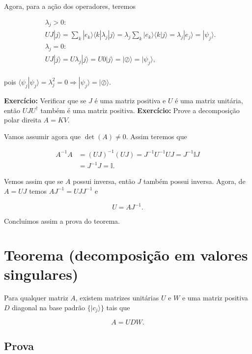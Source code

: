 \documentclass[11pt]{article}
\begin{document}
Agora, para a ação dos operadores, teremos

\begin{align}
& \lambda_{j}>0: \\
& UJ|j\rangle = \sum_{k}|e_{k}\rangle\langle k|\lambda_{j}|j\rangle = \lambda_{j}\sum_{k}|e_{k}\rangle\langle k|j\rangle = \lambda_{j}|e_{j}\rangle = |\psi_{j}\rangle. \\
& \lambda_{j}=0: \\
& UJ|j\rangle = U\lambda_{j}|j\rangle = U0|j\rangle  = |\oslash\rangle = |\psi_{j}\rangle, \\
\end{align}

pois
\(\langle\psi_{j}|\psi_{j}\rangle=\lambda_{j}^{2}=0\Rightarrow|\psi_{j}\rangle=|\oslash\rangle\).

\textbf{Exercício:} Verificar que se \(J\) é uma matriz positiva e \(U\)
é uma matriz unitária, então \(UJU^{\dagger}\) também é uma matriz
positiva. \textbf{Exercício:} Prove a decomposição polar direita
\(A=KV\).

Vamos assumir agora que \(\det(A)\ne 0\). Assim teremos que

\begin{align}
A^{-1}A & = (UJ)^{-1}(UJ)=J^{-1}U^{-1}UJ=J^{-1}\mathbb{I}J \\
&= J^{-1}J=\mathbb{I}.
\end{align}

Vemos assim que se \(A\) possui inversa, então \(J\) também possui
inversa. Agora, de \(A=UJ\) temos \(AJ^{-1}=UJJ^{-1}\) e

\begin{equation}
U=AJ^{-1}.
\end{equation}

Concluimos assim a prova do teorema.

    \section{Teorema (decomposição em valores
singulares)}\label{teorema-decomposiuxe7uxe3o-em-valores-singulares}

Para qualquer matriz \(A\), existem matrizes unitárias \(U\) e \(W\) e
uma matriz positiva \(D\) diagonal na base padrão \(\{|c_{j}\rangle\}\)
tais que

\begin{equation}
A = UDW.
\end{equation}

\subsection{Prova}\label{prova}
\end{document}
